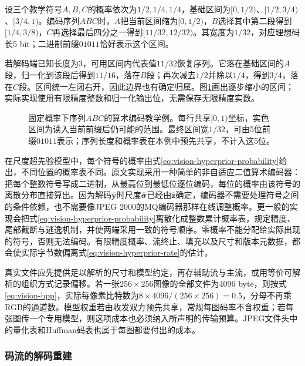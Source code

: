 设三个教学符号$A,B,C$的概率依次为$1/2,1/4,1/4$，基础区间为$[0,1/2)$、$[1/2,3/4)$、$[3/4,1)$。编码序列$ABC$时，$A$把当前区间缩为$[0,1/2)$，$B$选择其中第二段得到$[1/4,3/8)$，$C$再选择最后四分之一得到$[11/32,12/32)$。其宽度为$1/32$，对应理想码长5 bit；二进制前缀$01011$恰好表示这个区间。

若解码端已知长度为3，可用区间内代表值$11/32$恢复序列。它落在基础区间的$A$段，归一化到该段后得到$11/16$，落在$B$段；再次减去$1/2$并除以$1/4$，得到$3/4$，落在$C$段。区间统一左闭右开，因此边界也有确定归属。图\ref{fig:vision-arithmetic-coding}画出逐步缩小的区间；实际实现使用有限精度整数和归一化输出位，无需保存无限精度实数。

\begin{figure}[htbp]
 \centering
 
 \caption{固定概率下序列$ABC$的算术编码教学例。每行共享$[0,1)$坐标，实色区间为读入当前前缀后仍可能的范围。最终区间宽$1/32$，可由5位前缀$01011$表示；序列长度和概率表在本例中预先共享，不计入这5位。}
 \label{fig:vision-arithmetic-coding}
\end{figure}

在尺度超先验模型中，每个符号的概率由式\eqref{eq:vision-hyperprior-probability}给出，不同位置的概率表不同。原文实现采用一种简单的非自适应二值算术编码器：把每个整数符号写成二进制，从最高位到最低位逐位编码，每位的概率由该符号的离散分布直接算出。因为解码$\hat{\bm{y}}$时尺度$\hat{\bm{\sigma}}$已经由$\hat{\bm{z}}$确定，编码器不需要处理符号之间的条件依赖，也不需要像JPEG 2000的MQ编码器那样在线调整概率。更一般的实现会把式\eqref{eq:vision-hyperprior-probability}离散化成整数累计概率表，规定精度、尾部截断与逃逸机制，并使两端采用一致的符号顺序。零概率不能分配给实际出现的符号，否则无法编码。有限精度概率、流终止、填充以及尺寸和版本元数据，都会使实际字节数偏离式\eqref{eq:vision-hyperprior-rate}的估计。

真实文件应先提供足以解析的尺寸和模型约定，再存辅助流与主流，或用等价可解析的组织方式记录偏移。若一张$256\times256$图像的全部文件为4096 byte，则按式\eqref{eq:vision-bpp}，实际每像素比特数为$8\times4096/(256\times256)=0.5$，分母不再乘RGB的通道数。模型权重若由收发双方预先共享，常规每图码率不含权重；若每张图传一个专用模型，则这项成本也必须纳入所声明的传输预算。JPEG文件头中的量化表和Huffman码表也属于每图都要付出的成本。

\subsubsection{码流的解码重建}
\label{sec:vision-restoration-decoding}

